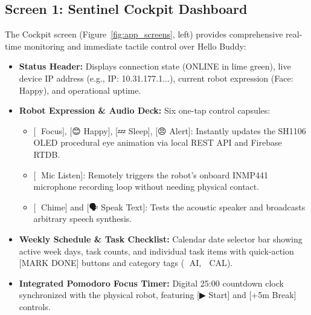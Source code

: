 \documentclass[11pt,a4paper,oneside]{report}
\newcommand{\ui}[1]{\textsf{#1}}
\newcommand{\ProductName}{Hello Buddy}
\begin{document}
\subsection{Screen 1: Sentinel Cockpit Dashboard}
The Cockpit screen (Figure~\ref{fig:app_screens}, left) provides comprehensive real-time monitoring and immediate tactile control over \ProductName:
\begin{itemize}[leftmargin=*]
\item \textbf{Status Header:} Displays connection state (\ui{ONLINE} in lime green), live device IP address (e.g., \ui{IP: 10.31.177.1...}), current robot expression (\ui{Face: Happy}), and operational uptime.
\item \textbf{Robot Expression \& Audio Deck:} Six one-tap control capsules:
  \begin{itemize}
  \item \ui{[🎯 Focus]}, \ui{[😊 Happy]}, \ui{[💤 Sleep]}, \ui{[😠 Alert]}: Instantly updates the SH1106 OLED procedural eye animation via local REST API and Firebase RTDB.
  \item \ui{[🎤 Mic Listen]}: Remotely triggers the robot's onboard INMP441 microphone recording loop without needing physical contact.
  \item \ui{[🔔 Chime]} and \ui{[🗣️ Speak Text]}: Tests the acoustic speaker and broadcasts arbitrary speech synthesis.
  \end{itemize}
\item \textbf{Weekly Schedule \& Task Checklist:} Calendar date selector bar showing active week days, task counts, and individual task items with quick-action \ui{[MARK DONE]} buttons and category tags (\ui{🤖 AI}, \ui{📅 CAL}).
\item \textbf{Integrated Pomodoro Focus Timer:} Digital 25:00 countdown clock synchronized with the physical robot, featuring \ui{[▶ Start]} and \ui{[+5m Break]} controls.
\end{itemize}
\end{document}
